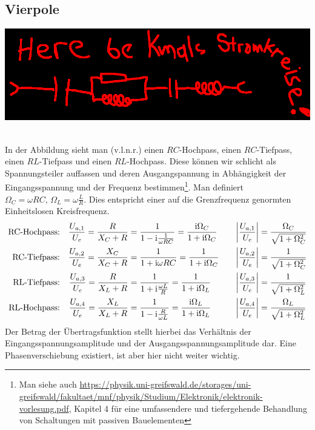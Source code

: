 \subsection*{Vierpole}
\begin{center}\includegraphics[width=.6\textwidth]{placeholder.png}\end{center}~\\
%
In der Abbildung sieht man (v.l.n.r.) einen $RC$-Hochpass, einen $RC$-Tiefpass, einen $RL$-Tiefpass
und einen $RL$-Hochpass.
Diese können wir schlicht als Spannungsteiler auffassen und deren Ausgangspannung in Abhängigkeit der Eingangsspannung und der Frequenz bestimmen\footnote{
Man siehe auch \url{https://physik.uni-greifswald.de/storages/uni-greifswald/fakultaet/mnf/physik/Studium/Elektronik/elektronik-vorlesung.pdf}, Kapitel 4 für eine umfassendere und tiefergehende Behandlung von Schaltungen mit passiven Bauelementen}.
Man definiert $\Omega_C = \omega RC, \, \Omega_L = \omega\frac{L}{R}$. Dies entspricht einer auf die Grenzfrequenz genormten Einheitslosen Kreisfrequenz.
\begin{align}
    \text{RC-Hochpass:} && 
    \frac{U_{a,1}}{U_e} = \frac{R}{X_C + R}   &=
        \frac{1}{1 - \mathrm{i} \frac{1}{\omega RC}} =
        \frac{\mathrm{i} \Omega_C}{1 + \mathrm{i} \Omega_C} &\quad
        \abs{\frac{U_{a,1}}{U_e}} &= \frac{\Omega_C}{\sqrt{1+\Omega_C^2}}\\
    \text{RC-Tiefpass:} && 
    \frac{U_{a,2}}{U_e} = \frac{X_C}{X_C + R} &= 
        \frac{1}{1 + \mathrm{i} \omega RC} =
        \frac{1}{1 + \mathrm{i} \Omega_C} &\quad
        \abs{\frac{U_{a,2}}{U_e}} &= \frac{1}{\sqrt{1+\Omega_C^2}}\\
    \text{RL-Tiefpass:} && 
    \frac{U_{a,3}}{U_e} = \frac{R}{X_L + R} &= 
        \frac{1}{1 + \mathrm{i}  \frac{\omega L}{R}} =
        \frac{1}{1 + \mathrm{i} \Omega_L} &\quad
        \abs{\frac{U_{a,3}}{U_e}} &= \frac{1}{\sqrt{1+\Omega_L^2}}\\
    \text{RL-Hochpass:} && 
    \frac{U_{a,4}}{U_e} = \frac{X_L}{X_L + R} &= 
        \frac{1}{1 - \mathrm{i} \frac{R}{\omega L}} =
        \frac{\mathrm{i} \Omega_L}{1 + \mathrm{i} \Omega_L} &\quad
        \abs{\frac{U_{a,4}}{U_e}} &= \frac{\Omega_L}{\sqrt{1+\Omega_L^2}} 
\end{align}
Der Betrag der Übertragsfunktion stellt hierbei das Verhältnis der Eingangsspannungsamplitude und der Ausgangsspannungsamplitude dar. Eine Phasenverschiebung existiert, ist aber hier nicht weiter wichtig.

